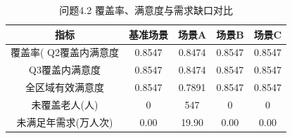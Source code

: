 \begin{table}[htbp]
\centering
\caption{问题4.2 覆盖率、满意度与需求缺口对比}
\begin{tabular}{|c|c|c|c|c|}
\hline
指标 & 基准场景 & 场景A & 场景B & 场景C \\
\hline
覆盖率(%
Q2覆盖内满意度 & 0.8547 & 0.8474 & 0.8547 & 0.8547 \\
Q3覆盖内满意度 & 0.8547 & 0.8474 & 0.8547 & 0.8547 \\
全区域有效满意度 & 0.8547 & 0.7891 & 0.8547 & 0.8547 \\
未覆盖老人(人) & 0 & 547 & 0 & 0 \\
未满足年需求(万人次) & 0.00 & 19.90 & 0.00 & 0.00 \\
\hline
\end{tabular}
\end{table}
